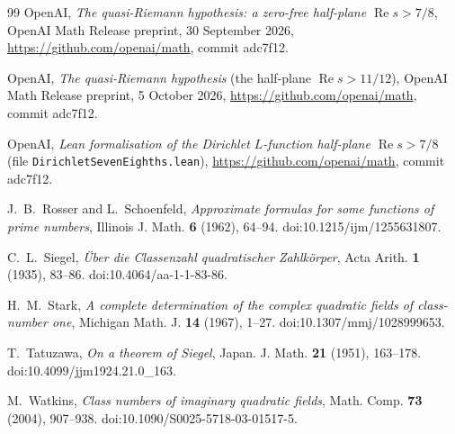 \documentclass[11pt]{amsart}
\theoremstyle{definition}
\theoremstyle{remark}
\renewcommand{\Re}{\operatorname{Re}}
\begin{document}
\begin{thebibliography}{99}
 OpenAI, \emph{The quasi-Riemann hypothesis: a zero-free half-plane $\Re s>7/8$}, OpenAI Math Release preprint, 30 September 2026, \url{https://github.com/openai/math}, commit adc7f12.

 OpenAI, \emph{The quasi-Riemann hypothesis} (the half-plane $\Re s>11/12$), OpenAI Math Release preprint, 5 October 2026, \url{https://github.com/openai/math}, commit adc7f12.

 OpenAI, \emph{Lean formalisation of the Dirichlet $L$-function half-plane $\Re s>7/8$} (file \texttt{DirichletSevenEighths.lean}), \url{https://github.com/openai/math}, commit adc7f12.

 J.~B.~Rosser and L.~Schoenfeld, \emph{Approximate formulas for some functions of prime numbers}, Illinois J. Math. \textbf{6} (1962), 64--94. doi:10.1215/ijm/1255631807.

 C.~L.~Siegel, \emph{\"Uber die Classenzahl quadratischer Zahlk\"orper}, Acta Arith. \textbf{1} (1935), 83--86. doi:10.4064/aa-1-1-83-86.

 H.~M.~Stark, \emph{A complete determination of the complex quadratic fields of class-number one}, Michigan Math. J. \textbf{14} (1967), 1--27. doi:10.1307/mmj/1028999653.

 T.~Tatuzawa, \emph{On a theorem of Siegel}, Japan. J. Math. \textbf{21} (1951), 163--178. doi:10.4099/jjm1924.21.0\_163.

 M.~Watkins, \emph{Class numbers of imaginary quadratic fields}, Math. Comp. \textbf{73} (2004), 907--938. doi:10.1090/S0025-5718-03-01517-5.

\end{thebibliography}
\end{document}
